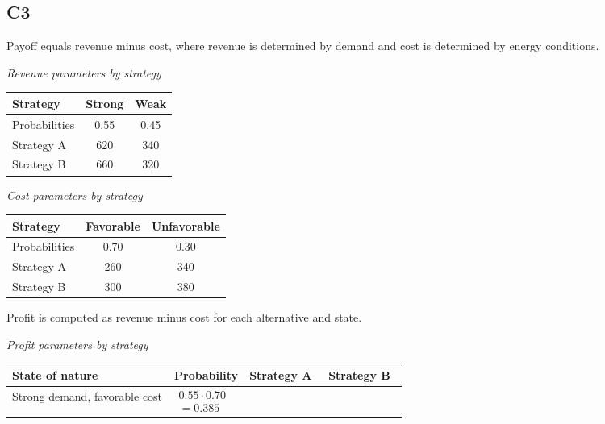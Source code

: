 \begin{ExamProblems}
		\subsection*{C3}
		Payoff equals revenue minus cost, where revenue is determined by demand and cost is determined by energy conditions.
		\begin{center}
			\begin{minipage}[t]{0.48\linewidth}
				\textit{Revenue parameters by strategy}
				\begin{center}
					\begin{tabular}{l c c}
						\toprule
						Strategy & Strong & Weak \\
						\midrule
						Probabilities & 0.55 & 0.45 \\
						Strategy A & 620 & 340 \\
						Strategy B & 660 & 320 \\
						\bottomrule
					\end{tabular}
				\end{center}
			\end{minipage}
			\hfill
			\begin{minipage}[t]{0.48\linewidth}
				\textit{Cost parameters by strategy}
				\begin{center}
					\begin{tabular}{l c c}
						\toprule
						Strategy & Favorable & Unfavorable \\
						\midrule
						Probabilities & 0.70 & 0.30 \\
						Strategy A & 260 & 340 \\
						Strategy B & 300 & 380 \\
						\bottomrule
					\end{tabular}
				\end{center}
			\end{minipage}
		\end{center}
		Profit is computed as revenue minus cost for each alternative and state.
		\begin{center}
			\textit{Profit parameters by strategy}
			\begin{tabular}{l p{0.17\linewidth} p{0.2\linewidth} p{0.2\linewidth}}
				\toprule
				State of nature & Probability & Strategy A & Strategy B \\
				\midrule
				Strong demand, favorable cost &
				$\begin{array}{l}
					0.55\cdot 0.70\\
					= 0.385
				\end{array}$ &

\end{tabular}
\end{center}
\end{ExamProblems}
